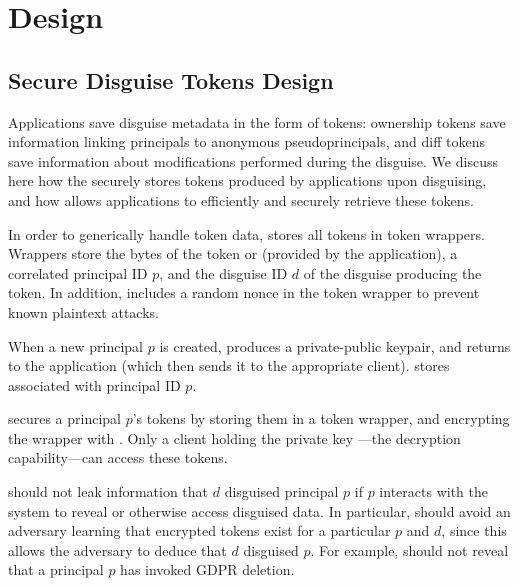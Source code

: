 \section{Design} 

\subsection{Secure Disguise Tokens Design} 
Applications save disguise metadata in the form of tokens: ownership tokens  save information linking
principals to anonymous pseudoprincipals, and diff tokens  save information about modifications
performed during the disguise. 
We discuss here how the \sys securely stores tokens produced by applications upon disguising, and
how \sys allows applications to efficiently and securely retrieve these tokens.

In order to generically handle token data, \sys stores all tokens in token wrappers. 
Wrappers store the bytes of the token  or  (provided
by the application), a correlated principal ID $p$, and the disguise ID $d$ of the disguise producing the
token. In addition, \sys includes a random nonce in the token wrapper to prevent known plaintext
attacks.

When a new principal $p$ is created, \sys produces a private-public keypair, and returns  to
the application (which then sends it to the appropriate client). \sys stores  associated
with principal ID $p$.

\sys secures a principal $p$'s tokens by storing them in a token wrapper, and encrypting the wrapper
with . Only a client holding the private key ---the decryption
capability---can access these tokens.

\sys should not leak information that $d$ disguised principal $p$ if $p$ interacts with the system
to reveal or otherwise access disguised data. In particular, \sys should avoid an adversary learning
that encrypted tokens exist for a particular $p$ and $d$, since this allows the adversary to deduce
that $d$ disguised $p$. For example, \sys should not reveal that a principal $p$ has invoked GDPR
deletion.

